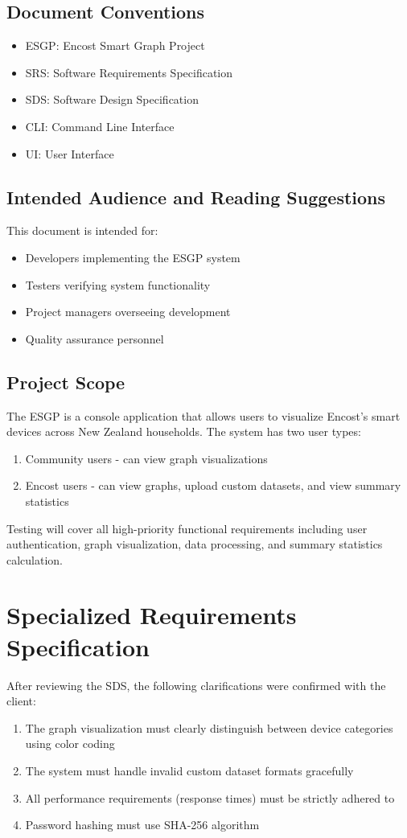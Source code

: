 \documentclass{scrreprt}
\begin{document}
\section{Document Conventions}
\begin{itemize}
    \item ESGP: Encost Smart Graph Project
    \item SRS: Software Requirements Specification
    \item SDS: Software Design Specification
    \item CLI: Command Line Interface
    \item UI: User Interface
\end{itemize}

\section{Intended Audience and Reading Suggestions}
This document is intended for:
\begin{itemize}
    \item Developers implementing the ESGP system
    \item Testers verifying system functionality
    \item Project managers overseeing development
    \item Quality assurance personnel
\end{itemize}

\section{Project Scope}
The ESGP is a console application that allows users to visualize Encost's smart devices across New Zealand households. The system has two user types:
\begin{enumerate}
    \item Community users - can view graph visualizations
    \item Encost users - can view graphs, upload custom datasets, and view summary statistics
\end{enumerate}

Testing will cover all high-priority functional requirements including user authentication, graph visualization, data processing, and summary statistics calculation.

\chapter{Specialized Requirements Specification}
After reviewing the SDS, the following clarifications were confirmed with the client:
\begin{enumerate}
    \item The graph visualization must clearly distinguish between device categories using color coding
    \item The system must handle invalid custom dataset formats gracefully
    \item All performance requirements (response times) must be strictly adhered to
    \item Password hashing must use SHA-256 algorithm
\end{enumerate}
\end{document}

